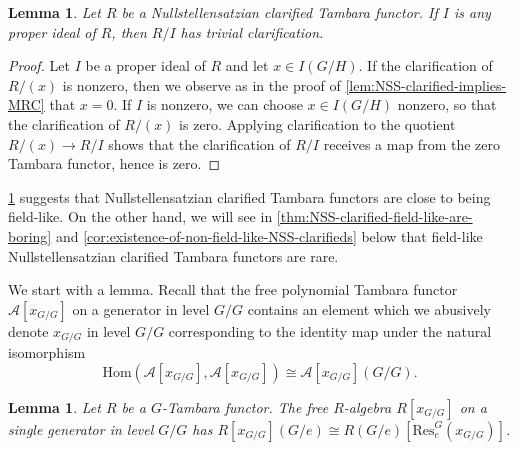 \documentclass[11pt,dvipsnames]{amsart}
\newtheorem{lemma}[theorem]{Lemma}
\theoremstyle{BoldRemark}
\begin{document}
\begin{lemma}\label{lem:NSS-clarified-are-weird}
	Let $R$ be a Nullstellensatzian clarified Tambara functor. If $I$ is any proper ideal of $R$, then $R/I$ has trivial clarification.
\end{lemma}

\begin{proof}
	Let $I$ be a proper ideal of $R$ and let $x \in I(G/H)$. If the clarification of $R/(x)$ is nonzero, then we observe as in the proof of \cref{lem:NSS-clarified-implies-MRC} that $x = 0$. If $I$ is nonzero, we can choose $x \in I(G/H)$ nonzero, so that the clarification of $R/(x)$ is zero. Applying clarification to the quotient $R/(x) \rightarrow R/I$ shows that the clarification of $R/I$ receives a map from the zero Tambara functor, hence is zero.
\end{proof}

\cref{lem:NSS-clarified-are-weird} suggests that Nullstellensatzian clarified Tambara functors are close to being field-like. On the other hand, we will see in \cref{thm:NSS-clarified-field-like-are-boring} and \cref{cor:existence-of-non-field-like-NSS-clarifieds} below that field-like Nullstellensatzian clarified Tambara functors are rare.

We start with a lemma. Recall that the free polynomial Tambara functor $\mathcal{A}[x_{G/G}]$ on a generator in level $G/G$ contains an element which we abusively denote $x_{G/G}$ in level $G/G$ corresponding to the identity map under the natural isomorphism \[ \mathrm{Hom}(\mathcal{A}[x_{G/G}], \mathcal{A}[x_{G/G}]) \cong \mathcal{A}[x_{G/G}](G/G) . \]

\begin{lemma}\label{lem:bottom-level-of-free-poly-alg-on-top-level-gen}
	Let $R$ be a $G$-Tambara functor. The free $R$-algebra $R[x_{G/G}]$ on a single generator in level $G/G$ has $R[x_{G/G}](G/e) \cong R(G/e)[\mathrm{Res}_e^G(x_{G/G})]$.
\end{lemma}
\end{document}
